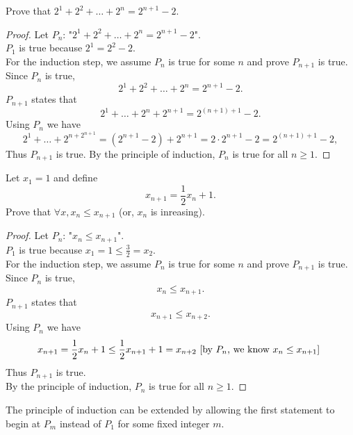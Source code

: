 \documentclass[math1010-lecture-notes]{subfiles}
\begin{document}
\begin{example}
  Prove that $2^{1}+2^2+\ldots+2^{n}=2^{n+1}-2$.
\end{example}

\begin{proof}
  Let $P_n$: "$2^{1}+2^2+\ldots+2^{n}=2^{n+1}-2$".\\
  $P_1$ is true because $2^{1}=2^2-2$. \\
  For the induction step, we assume $P_n$ is true for some  $n$ and prove $P_{n+1}$ is true. Since
   $P_n$ is true,  \[
   2^{1}+2^2+\ldots+2^{n} = 2^{n+1}-2
 .\]  $P_{n+1}$ states that  \[
 2^{1}+\ldots+2^{n}+2^{n+1} = 2^{\left( n+1 \right) +1}-2
 .\] Using $P_n$ we have  \[
 2^1+\ldots+2^{n + 2^{n+1}} = \left( 2^{n+1}-2 \right) +2^{n+1} = 2\cdot 2^{n+1}-2=2^{\left( n+1
 \right) +1}-2
 ,\] Thus $P_{n+1}$ is true. 
 By the principle of induction, $P_n$ is true for all  $n\ge 1$.
\end{proof}


\begin{example}
  Let $x_1=1$ and define \[
    x_{n+1}=\frac{1}{2}x_n+1
  .\] 
  Prove that $\forall x, x_n\le x_{n+1}$ (or, $x_n$ is inreasing).
\end{example}

\begin{proof}[Proof]
  Let $P_n$: "$x_n\le x_{n+1}$". \\
  $P_1$ is true because $x_1=1\le \frac{3}{2}=x_2$.\\
  For the induction step, we assume $P_n$ is true for some  $n$ and prove $P_{n+1}$ is true. Since
  $P_n$ is true,  \[
    x_n \le x_{n+1}
  .\] $P_{n+1}$ states that  \[
  x_{n+1} \le x_{n+2}
.\] Using $P_n$ we have  \[
x_{n+1} = \frac{1}{2}x_n+1\le \frac{1}{2}x_{n+1}+1=x_{n+2} \hfill~\text{[by $P_n$, we know $x_n\le x_{n+1}$]}~
\] Thus $P_{n+1}$ is true.\\
By the principle of induction, $P_n$ is true for all $n\ge 1$.
\end{proof}

The principle of induction can be extended by allowing the first statement to begin at $P_m$ instead
of  $P_1$ for some fixed integer $m$.
\end{document}
